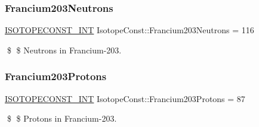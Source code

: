 \subsubsection{\texorpdfstring{Francium203\+Neutrons}{Francium203Neutrons}}
{\footnotesize\ttfamily \mbox{\hyperlink{group___isotope_const-_macros_ga5f18360b3e99483a35c32d789e62621c}{I\+S\+O\+T\+O\+P\+E\+C\+O\+N\+S\+T\+\_\+\+I\+NT}} Isotope\+Const\+::\+Francium203\+Neutrons = 116}

\$ \$ Neutrons in Francium-\/203. \mbox{\label{group___isotope_const-_francium-_fr203_ga3f84e7490e0f2cb846be58cbc1c5a825}} 
\subsubsection{\texorpdfstring{Francium203\+Protons}{Francium203Protons}}
{\footnotesize\ttfamily \mbox{\hyperlink{group___isotope_const-_macros_ga5f18360b3e99483a35c32d789e62621c}{I\+S\+O\+T\+O\+P\+E\+C\+O\+N\+S\+T\+\_\+\+I\+NT}} Isotope\+Const\+::\+Francium203\+Protons = 87}

\$ \$ Protons in Francium-\/203. 